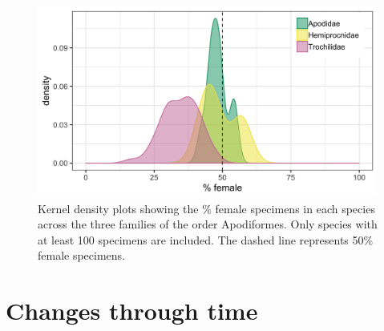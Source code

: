 \documentclass[a4paper, 12pt]{article}
\begin{document}
\begin{figure}[H]
 \centering
  \includegraphics[width = \linewidth]{figures/apodiforme-families.png}
  \caption{Kernel density plots showing the \% female specimens in each species across the three families of the order Apodiformes. 
  Only species with at least 100 specimens are included. 
  The dashed line represents 50\% female specimens. 
}
  \label{fig-apod}
\end{figure}

\newpage
\section{Changes through time}
\end{document}
